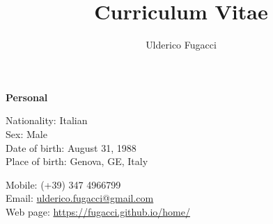 \documentclass[11pt]{article}
\begin{document}
\title{\bf Curriculum Vitae}
\author {Ulderico Fugacci}


\date{}
\maketitle


\noindent
{\Large\bf Personal}
\noindent\\

\begin{minipage}{.70\textwidth}

\vspace*{1ex}

Nationality: Italian\\
Sex: Male\\
Date of birth: August 31, 1988\\
Place of birth: Genova, GE, Italy\\




\vspace*{1ex}

Mobile: (+39) 347 4966799\\
Email: \href{mailto:ulderico.fugacci@gmail.com}{ulderico.fugacci@gmail.com}\\
Web page: \href{https://fugacci.github.io/home/}{https://fugacci.github.io/home/}\\


      \end{minipage}
\end{document}
